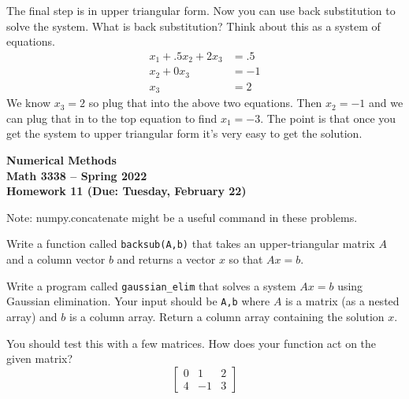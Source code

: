 \documentclass[11pt,letterpaper]{article}
\newcommand{\semester}{Spring 2022}
\newcommand{\due}{Tuesday, February 22}
\begin{document}
The final step is in upper triangular form. Now you can use back substitution to solve the system. What is back substitution? Think about this as a system of equations.
\begin{align*}
x_1 + .5x_2 + 2x_3 & = .5\\
x_2 + 0x_3 & = -1 \\
x_3 & = 2
\end{align*} 
We know $x_3=2$ so plug that into the above two equations. Then $x_2 = -1$ and we can plug that in to the top equation to find $x_1 = -3$. The point is that once you get the system to upper triangular form it's very easy to get the solution. 

\newpage

\begin{center}
{\huge{\bf  Numerical Methods}} \\[1.5ex]
{\bf Math 3338 -- \semester}\\[1.5ex]
{\Large{\bf Homework 11 (Due: \due)}}\\
\end{center}
\vspace{2mm}


Note: numpy.concatenate might be a useful command in these problems.

\begin{problem}
 Write a function called \texttt{backsub(A,b)} that takes an upper-triangular matrix $A$ and
a column vector $b$ and returns a vector $x$ so that $Ax=b$. 
\end{problem}



\begin{problem}
\label{prob:gauss}
 Write a program called \texttt{gaussian\_elim} that solves a system $Ax=b$ using Gaussian 
elimination. Your input should be \texttt{A,b} where $A$ is a matrix (as a nested array)
and $b$ is a column array. Return a column array containing the solution $x$.

You should test this with a few matrices. How does your function act on the given matrix?
\begin{equation*}
\begin{bmatrix} 0 & 1 & 2 \\ 4 & - 1 &  3 \end{bmatrix}
\end{equation*}
\end{problem}
\end{document}
